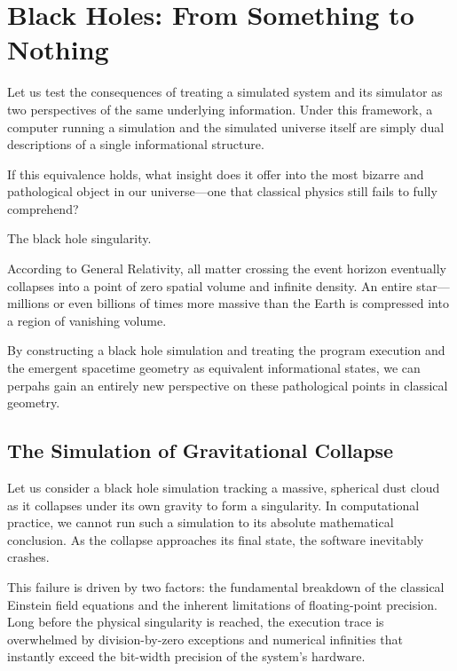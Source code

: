 \chapter{Black Holes: From Something to Nothing}
\label{chap:black-holes}

Let us test the consequences of treating a simulated system and its simulator as two perspectives of the same underlying information.
Under this framework, a computer running a simulation and the simulated universe itself are simply dual descriptions of a single informational structure.

If this equivalence holds, what insight does it offer into the most bizarre and pathological object in our universe—one that classical physics still fails to fully comprehend? 

The black hole singularity.

According to General Relativity, all matter crossing the event horizon eventually collapses into a point of zero spatial volume and infinite density.
An entire star—millions or even billions of times more massive than the Earth is compressed into a region of vanishing volume.

By constructing a black hole simulation and treating the program execution and the emergent spacetime geometry as equivalent informational states, 
we can perpahs gain an entirely new perspective on these pathological points in classical geometry.



\section*{The Simulation of Gravitational Collapse}

Let us consider a black hole simulation tracking a massive, spherical dust cloud as it collapses under its own gravity to form a singularity.
In computational practice, we cannot run such a simulation to its absolute mathematical conclusion.
As the collapse approaches its final state, the software inevitably crashes.

This failure is driven by two factors: the fundamental breakdown of the classical Einstein field equations and the inherent limitations of floating-point precision.
Long before the physical singularity is reached, the execution trace is overwhelmed by division-by-zero exceptions and numerical infinities that instantly exceed the bit-width 
precision of the system's hardware. 



